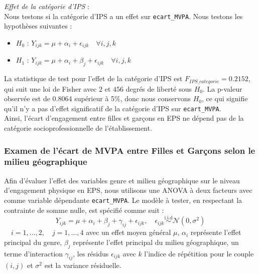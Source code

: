 \documentclass[12pt,a4paper]{article}
\begin{document}
\begin{enumerate}[label=\textbf{\alph*})]
	\noindent
	\textit{Effet de la catégorie d'IPS} : \\
	Nous testons si la catégorie d'IPS a un effet sur \texttt{ecart\_MVPA}. Nous testons les hypothèses suivantes :
	\begin{itemize}[label=--, leftmargin=*]
		\item \textbf{$H_0$} : $Y_{ijk} = \mu + \alpha_i + \epsilon_{ijk} \quad \forall i,j,k$ 
		\item \textbf{$H_1$} : $Y_{ijk} = \mu + \alpha_i + \beta_j + \epsilon_{ijk} \quad \forall i,j,k$
	\end{itemize}
	
	La statistique de test pour l'effet de la catégorie d'IPS est $F_{IPS\_categorie} = 0.2152$, qui suit une loi de Fisher avec $2$ et $456$ degrés de liberté sous $H_0$. La p-valeur observée est de 0.8064 supérieur à 5\%, donc nous conservons $H_0$, ce qui signifie qu'il n'y a pas d'effet significatif de la catégorie d'IPS sur \texttt{ecart\_MVPA}. \\
	
	Ainsi, l'écart d'engagement entre filles et garçons en EPS ne dépend pas de la catégorie socioprofessionnelle de l'établissement.\\
	

\end{enumerate}

\subsubsection{Examen de l'écart de MVPA entre Filles et Garçons selon le milieu géographique}
Afin d'évaluer l'effet des variables genre et milieu géographique sur le niveau d'engagement physique en EPS, nous utilisons une ANOVA à deux facteurs avec comme variable dépendante \texttt{ecart\_MVPA}. Le modèle à tester, en respectant la contrainte de somme nulle, est spécifié comme suit : 
\begin{equation}
	Y_{ijk} = \mu + \alpha_i + \beta_j + \gamma_{ij} + \epsilon_{ijk}, \quad \epsilon_{ijk} \overset{\text{i.i.d}}{\sim} \mathcal{N}(0,\sigma^2)\tag{M3}
\end{equation}
$\quad i = 1, \ldots, 2, \quad j = 1, \ldots, 4$
avec un effet moyen général $\mu$, $\alpha_i$ représente l'effet principal du genre, $\beta_j$ représente l'effet principal du milieu géographique, un terme d'interaction $\gamma_{ij}$, les résidus $\epsilon_{ijk}$ avec $k$ l'indice de répétition pour le couple $(i,j)$ et $\sigma^2$ est la variance résiduelle.\\
\end{document}
